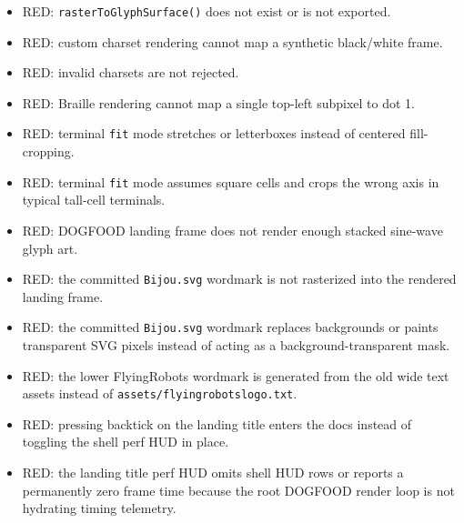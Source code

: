 \begin{itemize}
\tightlist
\item
  RED: \texttt{r\allowbreak{}a\allowbreak{}s\allowbreak{}t\allowbreak{}e\allowbreak{}r\allowbreak{}T\allowbreak{}o\allowbreak{}G\allowbreak{}l\allowbreak{}y\allowbreak{}p\allowbreak{}h\allowbreak{}S\allowbreak{}u\allowbreak{}r\allowbreak{}f\allowbreak{}a\allowbreak{}c\allowbreak{}e\allowbreak{}(\allowbreak{})} does not exist or is not exported.
\item
  RED: custom charset rendering cannot map a synthetic black/white frame.
\item
  RED: invalid charsets are not rejected.
\item
  RED: Braille rendering cannot map a single top-left subpixel to dot 1.
\item
  RED: terminal \texttt{f\allowbreak{}i\allowbreak{}t} mode stretches or letterboxes instead of centered fill-cropping.
\item
  RED: terminal \texttt{f\allowbreak{}i\allowbreak{}t} mode assumes square cells and crops the wrong axis in typical tall-cell terminals.
\item
  RED: DOGFOOD landing frame does not render enough stacked sine-wave glyph art.
\item
  RED: the committed \texttt{B\allowbreak{}i\allowbreak{}j\allowbreak{}o\allowbreak{}u\allowbreak{}.\allowbreak{}s\allowbreak{}v\allowbreak{}g} wordmark is not rasterized into the rendered landing frame.
\item
  RED: the committed \texttt{B\allowbreak{}i\allowbreak{}j\allowbreak{}o\allowbreak{}u\allowbreak{}.\allowbreak{}s\allowbreak{}v\allowbreak{}g} wordmark replaces backgrounds or paints transparent SVG pixels instead of acting as a background-transparent mask.
\item
  RED: the lower FlyingRobots wordmark is generated from the old wide text assets instead of \texttt{a\allowbreak{}s\allowbreak{}s\allowbreak{}e\allowbreak{}t\allowbreak{}s\allowbreak{}/\allowbreak{}f\allowbreak{}l\allowbreak{}y\allowbreak{}i\allowbreak{}n\allowbreak{}g\allowbreak{}r\allowbreak{}o\allowbreak{}b\allowbreak{}o\allowbreak{}t\allowbreak{}s\allowbreak{}l\allowbreak{}o\allowbreak{}g\allowbreak{}o\allowbreak{}.\allowbreak{}t\allowbreak{}x\allowbreak{}t}.
\item
  RED: pressing backtick on the landing title enters the docs instead of toggling the shell perf HUD in place.
\item
  RED: the landing title perf HUD omits shell HUD rows or reports a permanently zero frame time because the root DOGFOOD render loop is not hydrating timing telemetry.

\end{itemize}
